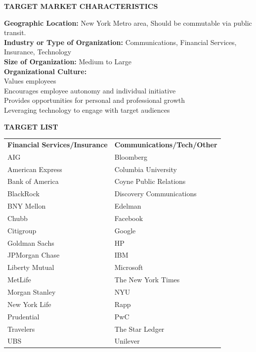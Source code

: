 \documentclass[letterpaper,11pt]{article}
\begin{document}
\begin{center}
\textbf{TARGET MARKET CHARACTERISTICS}
\end{center}
\textbf{Geographic Location:} New York Metro area, Should be commutable via public transit.\\
\textbf{Industry or Type of Organization:} Communications, Financial Services, Insurance, Technology\\
\textbf{Size of Organization:} Medium to Large\\
\textbf{Organizational Culture:}\\
Values employees\\
Encourages employee autonomy and individual initiative\\
Provides opportunities for personal and professional growth\\
Leveraging technology to engage with target audiences\\
\begin{center}
\textbf{TARGET LIST}
\end{center}
\begin{center}
\begin{tabular}{ll}
\textbf{Financial Services/Insurance} & \textbf{Communications/Tech/Other}\\
AIG & Bloomberg\\
American Express & Columbia University\\
Bank of America & Coyne Public Relations\\
BlackRock & Discovery Communications\\
BNY Mellon & Edelman\\
Chubb & Facebook\\
Citigroup & Google\\
Goldman Sachs & HP\\
JPMorgan Chase & IBM\\
Liberty Mutual & Microsoft\\
MetLife & The New York Times\\
Morgan Stanley & NYU\\
New York Life & Rapp\\
Prudential & PwC\\
Travelers & The Star Ledger\\
UBS & Unilever\\
\end{tabular}
\end{center}
\end{document}
